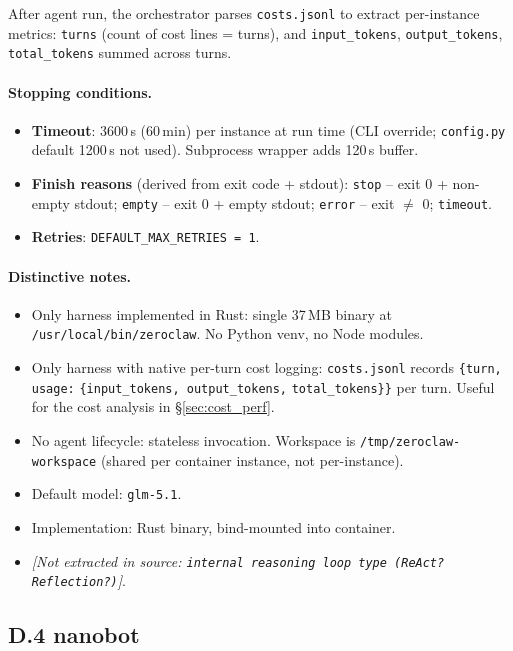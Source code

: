 \documentclass{llmxive}
\begin{document}
After agent run, the orchestrator parses \texttt{costs.jsonl} to extract per-instance metrics: \texttt{turns} (count of cost lines = turns), and \texttt{input\_tokens}, \texttt{output\_tokens}, \texttt{total\_tokens} summed across turns.

\paragraph{Stopping conditions.}
\begin{itemize}
  \item \textbf{Timeout}: 3600\,s (60\,min) per instance at run time (CLI override; \texttt{config.py} default 1200\,s not used). Subprocess wrapper adds 120\,s buffer.
  \item \textbf{Finish reasons} (derived from exit code + stdout): \texttt{stop} -- exit 0 + non-empty stdout; \texttt{empty} -- exit 0 + empty stdout; \texttt{error} -- exit $\neq$ 0; \texttt{timeout}.
  \item \textbf{Retries}: \texttt{DEFAULT\_MAX\_RETRIES = 1}.
\end{itemize}

\paragraph{Distinctive notes.}
\begin{itemize}
  \item Only harness implemented in Rust: single 37\,MB binary at \texttt{/usr/local/bin/zeroclaw}. No Python venv, no Node modules.
  \item Only harness with native per-turn cost logging: \texttt{costs.jsonl} records \texttt{\{turn, usage:} \texttt{\{input\_tokens, output\_tokens,} \texttt{total\_tokens\}\}} per turn. Useful for the cost analysis in \S\ref{sec:cost_perf}.
  \item No agent lifecycle: stateless invocation. Workspace is \texttt{/tmp/zeroclaw-workspace} (shared per container instance, not per-instance).
  \item Default model: \texttt{glm-5.1}.
  \item Implementation: Rust binary, bind-mounted into container.
  \item \textit{[Not extracted in source: \texttt{internal reasoning loop type (ReAct? Reflection?)}]}.
\end{itemize}

\subsection*{D.4 nanobot}
\end{document}
